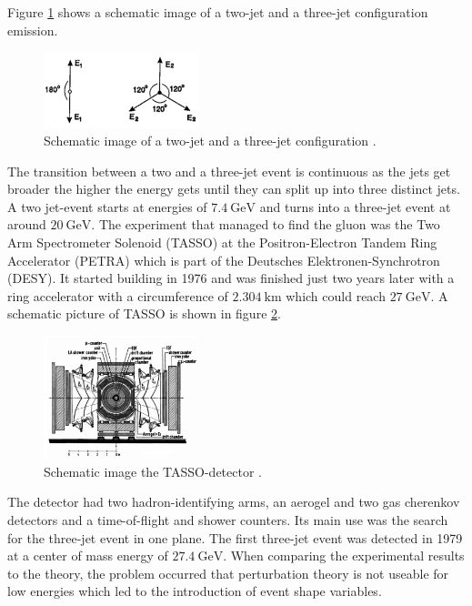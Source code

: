 Figure \ref{fig:jets} shows a schematic image of a two-jet and a three-jet configuration emission.
\begin{figure}
    \centering
    \includegraphics[width=0.4\textwidth]{figs/jets.png}
    \caption{Schematic image of a two-jet and a three-jet configuration \cite{Soding:1996zk}.}
    \label{fig:jets}
\end{figure}
The transition between a two and a three-jet event is continuous as the jets get broader the higher the energy gets until they can split up into three distinct jets.
A two jet-event starts at energies of $\SI{7.4}{\giga\eV}$ and turns into a three-jet event at around $\SI{20}{\giga\eV}$.
The experiment that managed to find the gluon was the Two Arm Spectrometer Solenoid (TASSO) at the Positron-Electron Tandem Ring Accelerator (PETRA) which is part of the Deutsches Elektronen-Synchrotron (DESY).
It started building in 1976 and was finished just two years later with a ring accelerator with a circumference of $\SI{2.304}{\kilo\meter}$ which could reach $\SI{27}{\giga\eV}$.
A schematic picture of TASSO is shown in figure \ref{fig:TASSO}.
\begin{figure}
    \centering
    \includegraphics[width=0.4\textwidth]{figs/TASSO.png}
    \caption{Schematic image the TASSO-detector \cite{TASSO:1979xej}.}
    \label{fig:TASSO}
\end{figure}
The detector had two hadron-identifying arms, an aerogel and two gas cherenkov detectors and a time-of-flight and shower counters.
Its main use was the search for the three-jet event in one plane.
The first three-jet event was detected in 1979 at a center of mass energy of $\SI{27.4}{\giga\eV}$.
When comparing the experimental results to the theory, the problem occurred that perturbation theory is not useable for low energies which led to the introduction of event shape variables.

